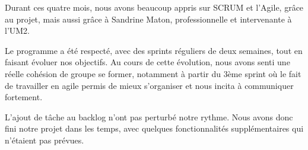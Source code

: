 Durant ces quatre mois, nous avons beaucoup appris sur SCRUM et l'Agile, grâce au projet, mais aussi grâce à Sandrine Maton, professionnelle et intervenante à l'UM2.

Le programme a été respecté, avec des sprints réguliers de deux semaines, tout en faisant évoluer nos objectifs.
Au cours de cette évolution, nous avons senti une réelle cohésion de groupe se former, notamment à partir du 3ème sprint où le fait de travailler en agile permis de mieux s'organiser et nous incita à communiquer fortement.

L'ajout de tâche au backlog n'ont pas perturbé notre rythme.
Nous avons donc fini notre projet dans les temps, avec quelques fonctionnalités supplémentaires qui n'étaient pas prévues.

